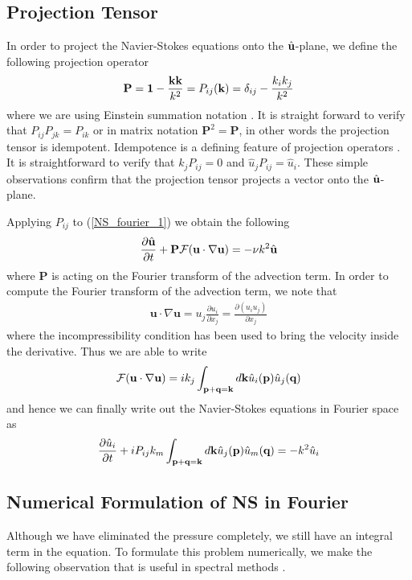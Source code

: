 \subsection{Projection Tensor}
In order to project the Navier-Stokes equations onto the $\hat{\textbf{u}}$-plane, we define the following projection operator
\begin{align}
\textbf{P}=\textbf{1} - \frac{\textbf{k}\textbf{k}}{k^{2}} = P_{ij}(\textbf{k}) = \delta_{ij} - \frac{k_{i}k_{j}}{k^{2}}
\end{align}
where we are using Einstein summation notation \cite{lesieur,wald}. It is straight forward to verify that $P_{ij}P_{jk}=P_{ik}$ or in matrix notation $\textbf{P}^{2}=\textbf{P}$, in other words the projection tensor is idempotent. Idempotence is a defining feature of projection operators \cite{MeyerLinAlg}. It is straightforward to verify that $k_{j}P_{ij}=0$ and $\hat{u}_{j}P_{ij}=\hat{u}_{i}$. These simple observations confirm that the projection tensor projects a vector onto the $\hat{\textbf{u}}$-plane. 

Applying $P_{ij}$ to (\ref{NS_fourier_1}) we obtain the following 
\begin{align}
\frac{\partial \hat{\textbf{u}}}{\partial t} + \textbf{P}\mathcal{F}(\textbf{u}\cdot\nabla\textbf{u}) =  -\nu k^{2}\hat{\textbf{u}}\label{NS_fourier_3}
\end{align}
where $\textbf{P}$ is acting on the Fourier transform of the advection term. In order to compute the Fourier transform of the advection term, we note that 
\begin{align}
\textbf{u}\cdot\nabla\textbf{u} = u_{j}\frac{\partial u_{i}}{\partial x_{j}} = \frac{\partial (u_{i}u_{j})}{\partial x_{j}}
\end{align}
where the incompressibility condition has been used to bring the velocity inside the derivative. Thus we are able to write
\begin{align}
\mathcal{F}(\textbf{u}\cdot\nabla\textbf{u})=ik_{j}\int_{\textbf{p}+\textbf{q}=\textbf{k}}d\textbf{k}\hat{u}_{i}(\textbf{p})\hat{u}_{j}(\textbf{q})
\end{align}
and hence we can finally write out the Navier-Stokes equations in Fourier space as \cite{lesieur}
\begin{align}
\frac{\partial \hat{u}_{i}}{\partial t} + iP_{ij}k_{m}\int_{\textbf{p}+\textbf{q}=\textbf{k}}d\textbf{k}\hat{u}_{j}(\textbf{p})\hat{u}_{m}(\textbf{q})=  -k^{2}\hat{u}_{i}\label{NS_fourier_3}
\end{align}

\subsection{Numerical Formulation of NS in Fourier}
Although we have eliminated the pressure completely, we still have an integral term in the equation. To formulate this problem numerically, we make the following observation that is useful in spectral methods \cite{lesieur,orszag1972}.

